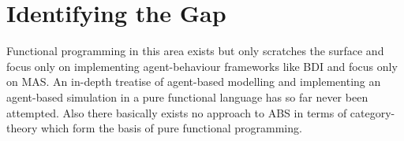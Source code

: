 \section{Identifying the Gap}
Functional programming in this area exists but only scratches the surface and focus only on implementing agent-behaviour frameworks like BDI and focus only on MAS. An in-depth treatise of agent-based modelling and implementing an agent-based simulation in a pure functional language has so far never been attempted. Also there basically exists no approach to ABS in terms of category-theory which form the basis of pure functional programming.